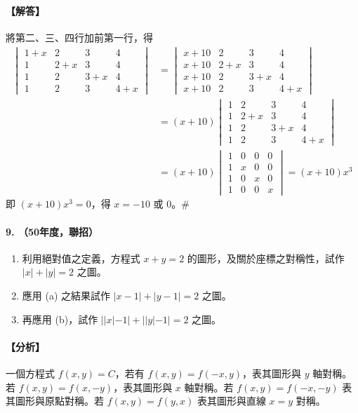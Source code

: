 \paragraph{【解答】}
將第二、三、四行加前第一行，得
\begin{align*}
\begin{vmatrix}
1+x & 2 & 3 & 4 \\
1 & 2+x & 3 & 4 \\
1 & 2 & 3+x & 4 \\
1 & 2 & 3 & 4+x
\end{vmatrix}
&= \begin{vmatrix}
x+10 & 2 & 3 & 4 \\
x+10 & 2+x & 3 & 4 \\
x+10 & 2 & 3+x & 4 \\
x+10 & 2 & 3 & 4+x
\end{vmatrix} \\
&= (x+10) \begin{vmatrix}
1 & 2 & 3 & 4 \\
1 & 2+x & 3 & 4 \\
1 & 2 & 3+x & 4 \\
1 & 2 & 3 & 4+x
\end{vmatrix} \\
&= (x+10) \begin{vmatrix}
1 & 0 & 0 & 0 \\
1 & x & 0 & 0 \\
1 & 0 & x & 0 \\
1 & 0 & 0 & x
\end{vmatrix} = (x+10)x^3
\end{align*}
即 $(x+10)x^3 = 0$，得 $x = -10 \text{ 或 } 0$。\hfill$\#$

\paragraph{9. （50年度，聯招）}
\begin{enumerate}[label=(\alph*), leftmargin=2em]
  \item 利用絕對值之定義，方程式 $x+y=2$ 的圖形，及關於座標之對稱性，試作 $|x|+|y|=2$ 之圖。
  \item 應用 (a) 之結果試作 $|x-1|+|y-1|=2$ 之圖。
  \item 再應用 (b)，試作 $||x|-1| + ||y|-1| = 2$ 之圖。
\end{enumerate}

\paragraph{【分析】}
一個方程式 $f(x,y)=C$，若有 $f(x,y)=f(-x,y)$，表其圖形與 $y$ 軸對稱。若 $f(x,y)=f(x,-y)$，表其圖形與 $x$ 軸對稱。若 $f(x,y)=f(-x,-y)$ 表其圖形與原點對稱。若 $f(x,y)=f(y,x)$ 表其圖形與直線 $x=y$ 對稱。

